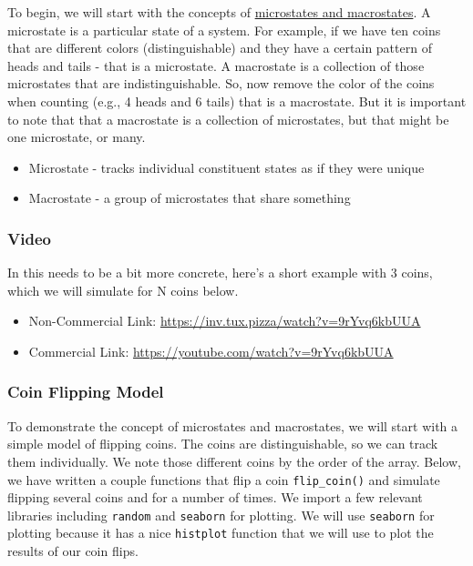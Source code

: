 To begin, we will start with the concepts of
\href{https://en.wikipedia.org/wiki/Microstate_(statistical_mechanics)}{microstates
and macrostates}. A microstate is a particular state of a system. For
example, if we have ten coins that are different colors
(distinguishable) and they have a certain pattern of heads and tails -
that is a microstate. A macrostate is a collection of those microstates
that are indistinguishable. So, now remove the color of the coins when
counting (e.g., 4 heads and 6 tails) that is a macrostate. But it is
important to note that that a macrostate is a collection of microstates,
but that might be one microstate, or many.

\begin{itemize}
\tightlist
\item
  Microstate - tracks individual constituent states as if they were
  unique
\item
  Macrostate - a group of microstates that share something
\end{itemize}

\subsubsection{Video}\label{video-1}

In this needs to be a bit more concrete, here's a short example with 3
coins, which we will simulate for N coins below.

\href{https://inv.tux.pizza/watch?v=9rYvq6kbUUA}{\pandocbounded{\texttt{[image: https://markdown-videos-api.jorgenkh.no/youtube/9rYvq6kbUUA?width=720\&height=405]}}}

\begin{itemize}
\tightlist
\item
  Non-Commercial Link: \url{https://inv.tux.pizza/watch?v=9rYvq6kbUUA}
\item
  Commercial Link: \url{https://youtube.com/watch?v=9rYvq6kbUUA}
\end{itemize}

\subsubsection{Coin Flipping Model}\label{coin-flipping-model}

To demonstrate the concept of microstates and macrostates, we will start
with a simple model of flipping coins. The coins are distinguishable, so
we can track them individually. We note those different coins by the
order of the array. Below, we have written a couple functions that flip
a coin \texttt{flip\_coin()} and simulate flipping several coins and for
a number of times. We import a few relevant libraries including
\texttt{random} and \texttt{seaborn} for plotting. We will use
\texttt{seaborn} for plotting because it has a nice \texttt{histplot}
function that we will use to plot the results of our coin flips.

